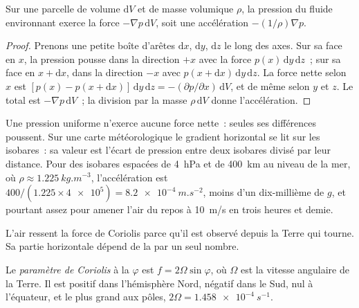 \begin{proposition}\label{prop:b1:atmospheric-circulation:pgf}
Sur une parcelle de volume $\mathrm dV$ et de masse volumique $\rho$, la pression du
fluide environnant exerce la force $-\nabla p\,\mathrm dV$, soit une accélération
$-(1/\rho)\nabla p$.
\end{proposition}

\begin{proof}
Prenons une petite boîte d'arêtes $\mathrm dx$, $\mathrm dy$, $\mathrm dz$ le long des
axes. Sur sa face en $x$, la pression pousse dans la direction $+x$ avec la force
$p(x)\,\mathrm dy\,\mathrm dz$~; sur sa face en $x + \mathrm dx$, dans la direction $-x$
avec $p(x + \mathrm dx)\,\mathrm dy\,\mathrm dz$. La force nette selon
$x$ est $[p(x) - p(x + \mathrm dx)]\,\mathrm dy\,\mathrm dz = -(\partial p/\partial
x)\,\mathrm dV$, et de même selon $y$ et $z$. Le total est $-\nabla p\,
\mathrm dV$~; la division par la masse $\rho\,\mathrm dV$ donne l'accélération.
\end{proof}

Une pression uniforme n'exerce aucune force nette~: seules ses différences poussent. Sur une carte
météorologique le gradient horizontal se lit sur les isobares~: sa valeur est l'écart de pression
entre deux isobares divisé par leur distance. Pour des isobares espacées de \qty{4}{hPa} et de
\qty{400}{km} au niveau de la mer, où $\rho \approx \qty{1.225}{kg.m^{-3}}$,
l'accélération est $400/(1.225 \times \num{4e5}) = \qty{8.2e-4}{m.s^{-2}}$, moins
d'un dix-millième de $g$, et pourtant assez pour amener l'air du repos à \qty{10}{m/s} en
trois heures et demie.

L'air ressent la force de Coriolis parce qu'il est observé depuis la Terre qui tourne. Sa
partie horizontale dépend de la  par un seul nombre.

\begin{definition}\label{def:b1:atmospheric-circulation:coriolis-parameter}
Le \emph{paramètre de Coriolis} à la  $\varphi$ est
$f = 2\Omega\sin\varphi$, où $\Omega$ est la vitesse angulaire de la Terre. Il est
positif dans l'hémisphère Nord, négatif dans le Sud, nul à l'équateur,
et le plus grand aux pôles, $2\Omega = \qty{1.458e-4}{s^{-1}}$.
\end{definition}

